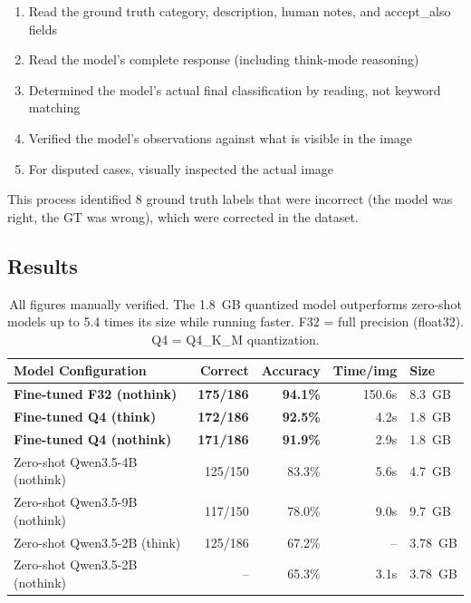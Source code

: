 \documentclass[12pt, a4paper]{article}
\begin{document}
\begin{enumerate}
    \item Read the ground truth category, description, human notes, and accept\_also fields
    \item Read the model's complete response (including think-mode reasoning)
    \item Determined the model's actual final classification by reading, not keyword matching
    \item Verified the model's observations against what is visible in the image
    \item For disputed cases, visually inspected the actual image
\end{enumerate}

This process identified 8 ground truth labels that were incorrect (the model was right, the GT was wrong), which were corrected in the dataset.

\subsection{Results}

\begin{table}[H]
\centering
\begin{tabular}{lrrrl}
\toprule
\textbf{Model Configuration} & \textbf{Correct} & \textbf{Accuracy} & \textbf{Time/img} & \textbf{Size} \\
\midrule
\textbf{Fine-tuned F32 (nothink)} & \textbf{175/186} & \textbf{94.1\%} & 150.6s & 8.3~GB \\
\textbf{Fine-tuned Q4 (think)} & \textbf{172/186} & \textbf{92.5\%} & 4.2s & 1.8~GB \\
\textbf{Fine-tuned Q4 (nothink)} & \textbf{171/186} & \textbf{91.9\%} & 2.9s & 1.8~GB \\
\midrule
Zero-shot Qwen3.5-4B (nothink) & 125/150 & 83.3\% & 5.6s & 4.7~GB \\
Zero-shot Qwen3.5-9B (nothink) & 117/150 & 78.0\% & 9.0s & 9.7~GB \\
Zero-shot Qwen3.5-2B (think) & 125/186 & 67.2\% & -- & 3.78~GB \\
Zero-shot Qwen3.5-2B (nothink) & -- & 65.3\% & 3.1s & 3.78~GB \\
\bottomrule
\end{tabular}
\caption{All figures manually verified. The 1.8~GB quantized model outperforms zero-shot models up to 5.4 times its size while running faster. F32 = full precision (float32). Q4 = Q4\_K\_M quantization.}
\label{tab:results}
\end{table}
\end{document}
